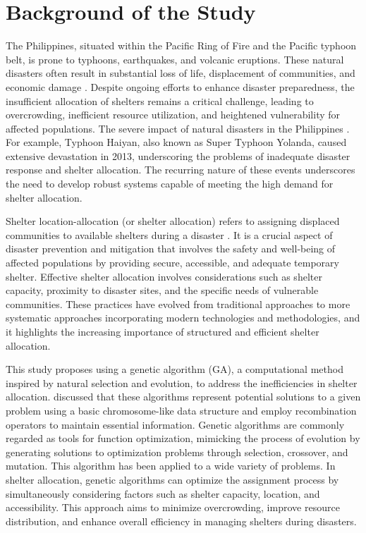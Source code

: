 \section{Background of the Study}

The Philippines, situated within the Pacific Ring of Fire and the Pacific typhoon belt, is prone to typhoons, earthquakes, and volcanic eruptions.
These natural disasters often result in substantial loss of life, displacement of communities, and economic damage \parencite{1}. Despite ongoing efforts to enhance disaster preparedness, the insufficient allocation of shelters remains a critical challenge, leading to overcrowding, inefficient resource utilization, and heightened vulnerability for affected populations. The severe impact of natural disasters in the Philippines \parencite{1}. For example, Typhoon Haiyan, also known as Super Typhoon Yolanda, caused extensive devastation in 2013, underscoring the problems of inadequate disaster response and shelter allocation. The recurring nature of these events underscores the need to develop robust systems capable of meeting the high demand for shelter allocation.

Shelter location-allocation (or shelter allocation) refers to assigning displaced communities to available shelters during a disaster \parencite{2}. It is a crucial aspect of disaster prevention and mitigation that involves the safety and well-being of affected populations by providing secure, accessible, and adequate temporary shelter. Effective shelter allocation involves considerations such as shelter capacity, proximity to disaster sites, and the specific needs of vulnerable communities. These practices have evolved from traditional approaches to more systematic approaches incorporating modern technologies and methodologies, and it highlights the increasing importance of structured and efficient shelter allocation.

This study proposes using a genetic algorithm (GA), a computational method inspired by natural selection and evolution, to address the inefficiencies in shelter allocation. \textcite{3} discussed that these algorithms represent potential solutions to a given problem using a basic chromosome-like data structure and employ recombination operators to maintain essential information. Genetic algorithms are commonly regarded as tools for function optimization, mimicking the process of evolution by generating solutions to optimization problems through selection, crossover, and mutation. This algorithm has been applied to a wide variety of problems. In shelter allocation, genetic algorithms can optimize the assignment process by simultaneously considering factors such as shelter capacity, location, and accessibility. This approach aims to minimize overcrowding, improve resource distribution, and enhance overall efficiency in managing shelters during disasters.

